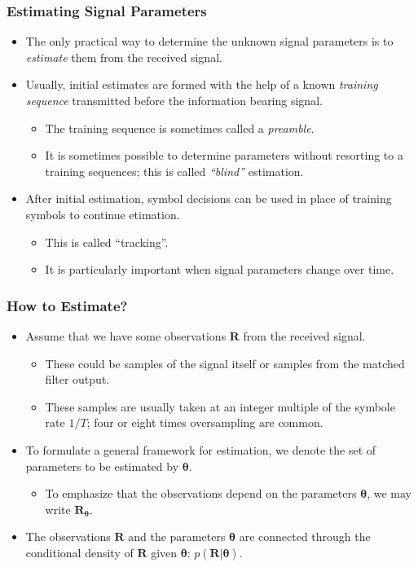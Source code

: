 \begin{frame}
  \frametitle{Estimating Signal Parameters}
  \begin{itemize}
  \item The only practical way to determine the unknown signal
    parameters is to \emph{estimate} them from the received signal.
  \item Usually, initial estimates are formed with the help of a known
    \emph{training sequence} transmitted before the information
    bearing signal.
    \begin{itemize}
    \item The training sequence is sometimes called a \emph{preamble}.
    \item It is sometimes possible to determine parameters without
      resorting to a training sequences; this is called
      \emph{``blind''} estimation.
    \end{itemize}
  \item After initial estimation, symbol decisions can be used in
    place of training symbols to continue etimation.
    \begin{itemize}
      \item This is called ``tracking''.
      \item It is particularly important when signal parameters change
        over time.
      \end{itemize}
  \end{itemize}
\end{frame}

\begin{frame}
  \frametitle{How to Estimate?}
  \begin{itemize}
  \item Assume that we have some observations $\bm{R}$ from the
    received signal.
    \begin{itemize}
    \item These could be samples of the signal itself or samples from
      the matched filter output.
    \item These samples are usually taken at an integer multiple of
      the symbole rate $1/T$; four or eight times oversampling are
      common.
    \end{itemize}
  \item To formulate a general framework for estimation, we denote
    the set of parameters to be estimated by $\bm{\theta}$.
    \begin{itemize}
    \item To emphasize that the observations depend on the
      parameters $\bm{\theta}$, we may write $\bm{R}_{\bm{\theta}}$.
    \end{itemize}
  \item The observations $\bm{R}$ and the parameters
    $\bm{\theta}$ are connected through the conditional density of
    $\bm{R}$ given $\bm{\theta}$: $p(\bm{R} | \bm{\theta})$.
  \end{itemize}
\end{frame}

